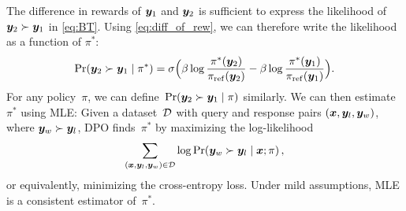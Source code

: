 The difference in rewards of ${\bm{y}}_1$ and ${\bm{y}}_2$ is sufficient to express the likelihood of ${\bm{y}}_2 \succ {\bm{y}}_1$ in \cref{eq:BT}. Using \cref{eq:diff_of_rew}, we can therefore write the likelihood as a function of $\pi^*$: 
{\ifnotarxiv\small\fi
\begin{equation}
\label{eq:likelihood}
    \Pr({\bm{y}}_2 \succ {\bm{y}}_1 \mid \pi^*) = \sigma \Big(\beta \log\frac{\pi^*({\bm{y}}_2)}{\pi_{\rm ref}({\bm{y}}_2)} - \beta \log\frac{\pi^*({\bm{y}}_1)}{\pi_{\rm ref}({\bm{y}}_1)} \Big)
    .
\end{equation}
}For any policy~$\pi$, we can define~$\Pr({\bm{y}}_2 \succ {\bm{y}}_1 \mid \pi)$ similarly. We can then estimate~$\pi^*$ using MLE: Given a dataset~${\mathcal{D}}$ with query and response pairs $({\bm{x}}, {\bm{y}}_l, {\bm{y}}_w)$, where ${\bm{y}}_w \succ {\bm{y}}_l$, DPO finds~$\pi^*$ by maximizing the log-likelihood 
%
\begin{equation}
\label{eq:dpo_ml}
    \sum_{({\bm{x}}, {\bm{y}}_l, {\bm{y}}_w) \in {\mathcal{D}}} \log \Pr({\bm{y}}_w \succ {\bm{y}}_l \mid {\bm{x}}; \pi)
    \,,
\end{equation}
%
or equivalently, minimizing the cross-entropy loss. Under mild assumptions, MLE is a consistent estimator of~$\pi^*$.

